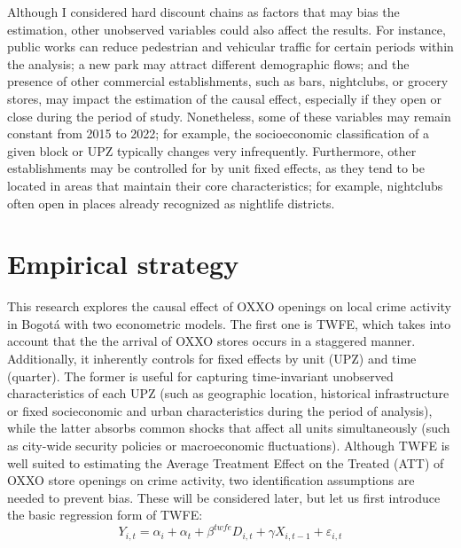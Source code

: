 \documentclass[12pt]{article}
\begin{document}
Although I considered hard discount chains as factors that may bias the estimation, other unobserved variables could also affect the results. For instance, public works can reduce pedestrian and vehicular traffic for certain periods within the analysis; a new park may attract different demographic flows; and the presence of other commercial establishments, such as bars, nightclubs, or grocery stores, may impact the estimation of the causal effect, especially if they open or close during the period of study. Nonetheless, some of these variables may remain constant from 2015 to 2022; for example, the socioeconomic classification of a given block or UPZ typically changes very infrequently. Furthermore, other establishments may be controlled for by unit fixed effects, as they tend to be located in areas that maintain their core characteristics; for example, nightclubs often open in places already recognized as nightlife districts.

\section{Empirical strategy}
\label{sec:Empirical}

This research explores the causal effect of OXXO openings on local crime activity in Bogotá with two econometric models. The first one is TWFE, which takes into account that the the arrival of OXXO stores occurs in a staggered manner. Additionally, it inherently controls for fixed effects by unit (UPZ) and time (quarter). The former is useful for capturing time-invariant unobserved characteristics of each UPZ (such as geographic location, historical infrastructure or fixed socieconomic and urban characteristics during the period of analysis), while the latter absorbs common shocks that affect all units simultaneously (such as city-wide security policies or macroeconomic fluctuations). Although TWFE is well suited to estimating the Average Treatment Effect on the Treated (ATT) of OXXO store openings on crime activity, two identification assumptions are needed to prevent bias. These will be considered later, but let us first introduce the basic regression form of TWFE:\\

\begin{equation}
Y_{i,t} = \alpha_i + \alpha_t  +\beta^{twfe} D_{i,t} + \gamma X_{i,t-1}+ \varepsilon_{i,t}
\label{eq:twfe}
\end{equation}
\end{document}
